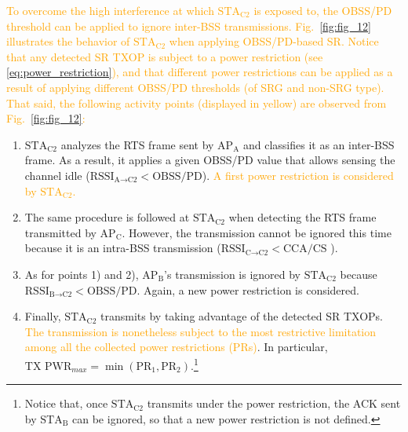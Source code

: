 \documentclass{ieeeaccess}
\begin{document}
\textcolor{orange}{To overcome the high interference at which $\text{STA}_\text{C2}$ is exposed to, the OBSS/PD threshold can be applied to ignore inter-BSS transmissions. Fig.~\ref{fig:fig_12} illustrates the behavior of $\text{STA}_\text{C2}$ when applying OBSS/PD-based SR. Notice that any detected SR TXOP is subject to a power restriction (see \eqref{eq:power_restriction}), and that different power restrictions can be applied as a result of applying different OBSS/PD thresholds (of SRG and non-SRG type). That said, the following activity points (displayed in yellow) are observed from Fig.~\ref{fig:fig_12}:}
\begin{enumerate}
	\item $\text{STA}_\text{C2}$ analyzes the RTS frame sent by $\text{AP}_\text{A}$ and classifies it as an inter-BSS frame. As a result, it applies a given OBSS/PD value that allows sensing the channel idle ($\text{RSSI}_{\text{A} \rightarrow \text{C2}} < \text{OBSS/PD}$). \textcolor{orange}{A first power restriction is considered by $\text{STA}_\text{C2}$.}
	\item The same procedure is followed at $\text{STA}_\text{C2}$ when detecting the RTS frame transmitted by $\text{AP}_\text{C}$. However, the transmission cannot be ignored this time because it is an intra-BSS transmission ($\text{RSSI}_{\text{C} \rightarrow \text{C2}} < \text{CCA/CS}$ ).
	\item As for points 1) and 2), $\text{AP}_\text{B}$'s transmission is ignored by $\text{STA}_\text{C2}$ because $\text{RSSI}_{\text{B} \rightarrow \text{C2}} < \text{OBSS/PD}$. Again, a new power restriction is considered.
	\item Finally, $\text{STA}_\text{C2}$ transmits by taking advantage of the detected SR TXOPs. \textcolor{orange}{The transmission is nonetheless subject to the most restrictive limitation among all the collected power restrictions (PRs)}. In particular, $\text{TX PWR}_{max} = \min(\text{PR}_1, \text{PR}_2)$.\footnote{Notice that, once $\text{STA}_\text{C2}$ transmits under the power restriction, the ACK sent by $\text{STA}_\text{B}$ can be ignored, so that a new power restriction is not defined.}
\end{enumerate}
\end{document}
